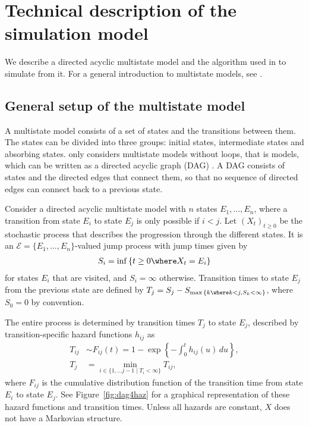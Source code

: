 \section[Technical description]{Technical description of the simulation model}\label{tech}
We describe a directed acyclic multistate model and the algorithm used in  to simulate from it. For a general introduction to multistate models, see \citet{Putter2007}.

\subsection[Multistate Model]{General setup of the multistate model}\label{msm}
A multistate model consists of a set of states and the transitions between them. The states can be divided into three groups: initial states, intermediate states and absorbing states.  only considers multistate models without loops, that is models, which can be written  as a directed acyclic graph (DAG) \citep{Pearl2009}. A DAG consists of states and the directed edges that connect them, so that no sequence of directed edges can connect back to a previous state.

Consider a directed acyclic multistate model with $n$ states $E_1, \dots, E_n$, where a transition from state $E_i$ to state $E_j$ is only possible if $i<j$. Let $\left(X_t\right)_{t\geq 0}$ be the stochastic process that describes the progression through the different states. It is an $\mathcal{E} = \{E_1, \dots, E_n\}$-valued jump process with jump times given by
\begin{align} \label{eqn:Si}
	S_i = \inf \left\{ t \geq 0 \where X_t = E_i \right\}
\end{align}
for states $E_i$ that are visited, and $S_i=\infty$ otherwise. Transition times to state $E_j$ from the previous state are defined by $T_j=S_j-S_{\max{\{k \where k<j, S_k<\infty\}}}$, where $S_0=0$ by convention. 

The entire process is determined by transition times $T_j$ to state $E_j$, described by transition-specific hazard functions $h_{ij}$ as 
\begin{align} \label{eqn:Tij}
	T_{ij} &\sim  F_{ij}(t) = 1 - \exp\left\{ -\int_0^t h_{ij}(u) \, du \right\}, \\
	T_j &= \min_{i \in \{1, \dots j-1 \;\vert\; T_i<\infty\}} T_{ij}, %
\end{align}
where $F_{ij}$ is the cumulative distribution function of the transition time from state $E_i$ to state $E_j$. See Figure~\ref{fig:dag4haz} for a graphical representation of these hazard functions and transition times. Unless all hazards are constant, $X$ does not have a Markovian structure. 

